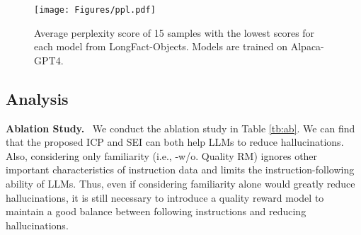 \begin{figure}
    \centering
    \texttt{[image: Figures/ppl.pdf]}
    \caption{Average perplexity score of 15 samples with the lowest scores for each model from LongFact-Objects. Models are trained on Alpaca-GPT4.}
    \label{fig_ppl}
\end{figure}

\begin{table}
\scriptsize	
\centering
{}
\caption{Results of ablation and scalability study. We report FactScore results on BioGEN. Models are trained on Alpaca-GPT4. RM represents the reward model.}
\label{tb:ab} 
\end{table}

\subsection{Analysis}
\textbf{Ablation Study.}
\
We conduct the ablation study in Table \ref{tb:ab}.
We can find that the proposed ICP and SEI can both help LLMs to reduce hallucinations.
Also, considering only familiarity (i.e., -w/o. Quality RM) ignores other important characteristics of instruction data and limits the instruction-following ability of LLMs.
Thus, even if considering familiarity alone would greatly reduce hallucinations, it is still necessary to introduce a quality reward model to maintain a good balance between following instructions and reducing hallucinations.



